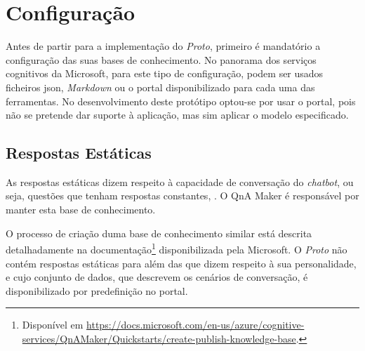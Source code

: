 \section{Configuração}
\label{sec:chap05_configprocess}
Antes de partir para a implementação do \textit{Proto}, primeiro é mandatório a configuração das suas bases de conhecimento. No panorama dos serviços cognitivos da Microsoft, para este tipo de configuração, podem ser usados ficheiros \gls{json}, \textit{Markdown} ou o portal disponibilizado para cada uma das ferramentas. No desenvolvimento deste protótipo optou-se por usar o portal, pois não se pretende dar suporte à aplicação, mas sim aplicar o modelo especificado.

\subsection{Respostas Estáticas}
As respostas estáticas dizem respeito à capacidade de conversação do \textit{chatbot}, ou seja, questões que tenham respostas constantes, . O QnA Maker é responsável por manter esta base de conhecimento.

O processo de criação duma base de conhecimento similar está descrita detalhadamente na documentação\footnote{Disponível em \url{https://docs.microsoft.com/en-us/azure/cognitive-services/QnAMaker/Quickstarts/create-publish-knowledge-base}.} disponibilizada pela Microsoft. O \textit{Proto} não contém respostas estáticas para além das que dizem respeito à sua personalidade, e cujo conjunto de dados, que descrevem os cenários de conversação, é disponibilizado por predefinição no portal.

